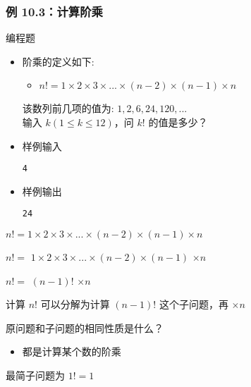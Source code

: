 \begin{frame}[fragile]
    \frametitle{例 10.3：计算阶乘}
     {
        \begin{exampleblock}{编程题}
            \begin{itemize}
                \item 阶乘的定义如下: \\
                    \begin{itemize}
                        \item $n! = 1 \times 2 \times 3 \times ... \times (n-2) \times (n-1) \times n$
                    \end{itemize}
                    该数列前几项的值为: $1,2,6,24,120,...$\\
                    输入 $k(1 \leq k \leq 12)$，问 $k!$ 的值是多少？
                
                \item 样例输入
    
                    \lstinline|4|     

                \item 样例输出
                
                    \lstinline|24|
    
            \end{itemize}
        \end{exampleblock}
    }
     {
        \begin{itemize}
             {\item $n! = 1 \times 2 \times 3 \times ... \times (n-2) \times (n-1) \times n$}
             {\item $n! = $ \uline{$1 \times 2 \times 3 \times ... \times (n-2) \times (n-1)$} $ \times n$}
            \item<3-> $n! = $ \uline{$(n-1)!$} $ \times n$
            \item<3-> 计算 $n!$ 可以分解为计算 $(n-1)!$ 这个子问题，再 $\times n$
            \item<4-> 原问题和子问题的相同性质是什么？
            \begin{itemize}
                \item<5-> 都是计算某个数的阶乘
            \end{itemize}
            \item<6> 最简子问题为 $1!=1$
        \end{itemize}
    }
     {
        
    }

\end{frame}

